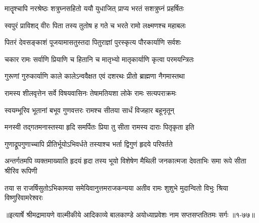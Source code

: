 \twolineshloka
{मातॄश्चापि नरश्रेष्ठः शत्रुघ्नसहितो ययौ}
{युधाजित् प्राप्य भरतं सशत्रुघ्नं प्रहर्षितः} %

\twolineshloka
{स्वपुरं प्राविशद् वीरः पिता तस्य तुतोष ह}
{गते च भरते रामो लक्ष्मणश्च महाबलः} %

\twolineshloka
{पितरं देवसङ्काशं पूजयामासतुस्तदा}
{पितुराज्ञां पुरस्कृत्य पौरकार्याणि सर्वशः} %

\twolineshloka
{चकार रामः सर्वाणि प्रियाणि च हितानि च}
{मातृभ्यो मातृकार्याणि कृत्वा परमयन्त्रितः} %

\twolineshloka
{गुरूणां गुरुकार्याणि काले कालेऽन्ववैक्षत}
{एवं दशरथः प्रीतो ब्राह्मणा नैगमास्तथा} %

\twolineshloka
{रामस्य शीलवृत्तेन सर्वे विषयवासिनः}
{तेषामतियशा लोके रामः सत्यपराक्रमः} %

\twolineshloka
{स्वयम्भूरिव भूतानां बभूव गुणवत्तरः}
{रामश्च सीतया सार्धं विजहार बहूनृतून्} %

\twolineshloka
{मनस्वी तद्गतमनास्तस्या हृदि समर्पितः}
{प्रिया तु सीता रामस्य दाराः पितृकृता इति} %

\twolineshloka
{गुणाद्रूपगुणाच्चापि प्रीतिर्भूयोऽभिवर्धते}
{तस्याश्च भर्ता द्विगुणं हृदये परिवर्तते} %

\threelineshloka
{अन्तर्गतमपि व्यक्तमाख्याति हृदयं हृदा}
{तस्य भूयो विशेषेण मैथिली जनकात्मजा}
{देवताभिः समा रूपे सीता श्रीरिव रूपिणी} %

\twolineshloka
{तया स राजर्षिसुतोऽभिकामया समेयिवानुत्तमराजकन्यया}
{अतीव रामः शुशुभे मुदान्वितो विभुः श्रिया विष्णुरिवामरेश्वरः} %


॥इत्यार्षे श्रीमद्रामायणे वाल्मीकीये आदिकाव्ये बालकाण्डे अयोध्याप्रवेशः नाम सप्तसप्ततितमः सर्गः ॥१-७७॥
